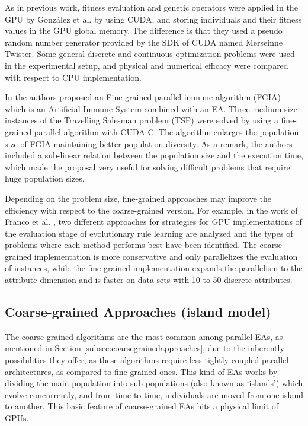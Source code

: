 \documentclass{article}
\begin{document}
As in previous work, fitness evaluation and genetic operators were applied in the GPU by Gonz\'alez et al. \cite{springerlink:10.1007978-3-642-12538-619} by using CUDA, and storing individuals and their fitness values in the GPU global memory. 
The difference is that they used a pseudo random number generator provided by the SDK of CUDA named Merseinne Twister. Some general discrete and continuous optimization problems were used in the experimental setup, and physical and numerical efficacy were compared with respect to CPU implementation. 

In \cite{Li:2009:PIA:1726585.1726930} the authors proposed an Fine-grained parallel immune algorithm (FGIA) which is an Artificial Immune System combined with an EA. Three medium-size instances of the Travelling Salesman problem (TSP) were solved by using a fine-grained parallel algorithm with CUDA C. The algorithm enlarges the population size of FGIA maintaining better population diversity. As a remark, the authors included a sub-linear relation between the population size and the execution time, which made the proposal very useful for solving difficult problems that require huge population sizes.



Depending on the problem size, fine-grained approaches may improve the
efficiency with respect to the coarse-grained version. For example, in
the work of Franco et al. \cite{Franco15LargeScale}, two different
approaches for strategies for GPU implementations of the evaluation
stage of evolutionary rule learning are analyzed and the types of
problems where each method performs best have been identified. The
coarse-grained implementation is more conservative and only
parallelizes the evaluation of instances, while the fine-grained
implementation expands the parallelism to the attribute dimension and
is faster on data sets with 10 to 50 discrete attributes. 


\subsection{Coarse-grained Approaches (island model)} %

The coarse-grained algorithms are the most common among parallel EAs, as mentioned in Section \ref{subsec:coarsegrainedapproaches}, due to the inherently possibilities they offer, as these algorithms require less tightly coupled parallel architectures, as compared to fine-grained ones. 
This kind of EAs works by dividing the main population into sub-populations (also known as `islands') which evolve concurrently, and from time to time, individuals are moved from one island to another. 
This basic feature of coarse-grained EAs hits a physical limit of
GPUs.  
\end{document}
